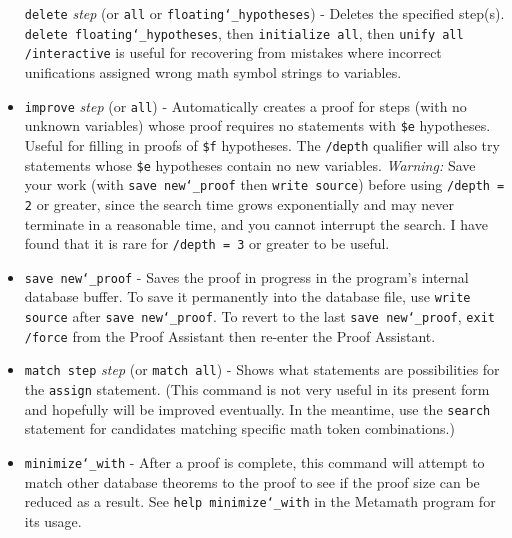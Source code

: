 \begin{itemize}
    \texttt{delete} {\em step} (or \texttt{all} or \texttt{floating{\char`\_}hypotheses}) -
        Deletes the specified
        step(s).  \texttt{delete floating{\char`\_}hypotheses}, then \texttt{initialize all}, then
        \texttt{unify all /interactive} is useful for recovering from mistakes
        where incorrect unifications assigned wrong math symbol strings to
        variables.
\item[]
    \texttt{improve} {\em step} (or \texttt{all}) -
      Automatically creates a proof for steps (with no unknown variables)
      whose proof requires no statements with \texttt{\$e} hypotheses.  Useful
      for filling in proofs of \texttt{\$f} hypotheses.  The \texttt{/depth}
      qualifier will also try statements whose \texttt{\$e} hypotheses contain
      no new variables.  {\em Warning:} Save your work (with \texttt{save
      new{\char`\_}proof} then \texttt{write source}) before using
      \texttt{/depth = 2} or greater, since the search time grows
      exponentially and may never terminate in a reasonable time, and you
      cannot interrupt the search.  I have found that it is rare for
      \texttt{/depth = 3} or greater to be useful.
 \item[]
    \texttt{save new{\char`\_}proof} - Saves the proof in progress in the program's
        internal database buffer.  To save it permanently into the database file,
        use \texttt{write source} after
        \texttt{save new{\char`\_}proof}.  To revert to the last
        \texttt{save new{\char`\_}proof},
        \texttt{exit /force} from the Proof Assistant then re-enter the Proof
        Assistant.
 \item[]
    \texttt{match step} {\em step} (or \texttt{match all}) - Shows what
        statements are
        possibilities for the \texttt{assign} statement. (This command
        is not very
        useful in its present form and hopefully will be improved
        eventually.  In the meantime, use the \texttt{search} statement for
        candidates matching specific math token combinations.)
 \item[]
 \texttt{minimize{\char`\_}with}
     - After a proof is complete, this command will attempt
        to match other database theorems to the proof to see if the proof
        size can be reduced as a result.  See \texttt{help
        minimize{\char`\_}with} in the
        Metamath program for its usage.
\end{itemize}

